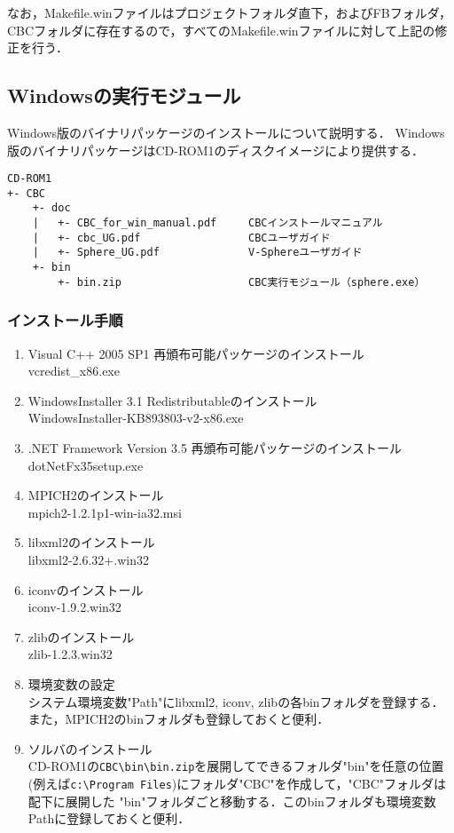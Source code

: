 なお，Makefile.winファイルはプロジェクトフォルダ直下，およびFBフォルダ，CBCフォルダに存在するので，すべてのMakefile.winファイルに対して上記の修正を行う．

%
\subsection{Windowsの実行モジュール}
\label{sec:win_binary}

Windows版のバイナリパッケージのインストールについて説明する．
Windows版のバイナリパッケージはCD-ROM1のディスクイメージにより提供する．
\begin{verbatim}
CD-ROM1
+- CBC
    +- doc
    |   +- CBC_for_win_manual.pdf     CBCインストールマニュアル
    |   +- cbc_UG.pdf                 CBCユーザガイド
    |   +- Sphere_UG.pdf              V-Sphereユーザガイド
    +- bin
        +- bin.zip                    CBC実行モジュール（sphere.exe）
\end{verbatim}


\subsubsection{インストール手順}

\begin{enumerate}
\item Visual C++ 2005 SP1 再頒布可能パッケージのインストール\\
vcredist\_x86.exe
\item WindowsInstaller 3.1 Redistributableのインストール \\
WindowsInstaller-KB893803-v2-x86.exe
\item .NET Framework Version 3.5 再頒布可能パッケージのインストール\\
dotNetFx35setup.exe
\item MPICH2のインストール\\
mpich2-1.2.1p1-win-ia32.msi
\item libxml2のインストール\\
libxml2-2.6.32+.win32
\item iconvのインストール\\
iconv-1.9.2.win32
\item zlibのインストール\\
zlib-1.2.3.win32
\item 環境変数の設定\\
システム環境変数"Path"にlibxml2, iconv, zlibの各binフォルダを登録する．また，MPICH2のbinフォルダも登録しておくと便利．
\item ソルバのインストール\\
CD-ROM1の\verb|CBC\bin\bin.zip|を展開してできるフォルダ"bin"を任意の位置(例えば\verb|c:\Program Files|)にフォルダ"CBC"を作成して，"CBC"フォルダは配下に展開した   "bin"フォルダごと移動する．このbinフォルダも環境変数Pathに登録しておくと便利．
\end{enumerate}
